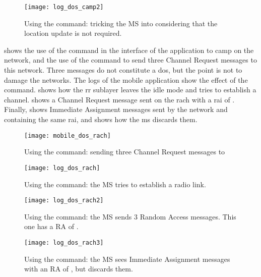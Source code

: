       \begin{figure}
        \centering
        \texttt{[image: log\_dos\_camp2]}
        \caption{Using the  command: tricking the MS into
        considering that the location update is not required.}
        \label{fig:log_dos_camp2}
      \end{figure}

       shows the use of the 
      command in the interface of the  application to camp
      on the  network, and the use of the 
      command to send three Channel Request messages to this network.
      Three messages do not constitute a \gls{dos}, but the point is
      not to damage the networks. The logs of the mobile application
      show the effect of the command.  shows how
      the \gls{rr} sublayer leaves the idle mode and tries to establish
      a channel.  shows a Channel Request
      message sent on the \gls{rach} with a \gls{rai} of .
      Finally,  shows Immediate Assignment
      messages sent by the network and containing the same \gls{rai},
      and shows how the \gls{ms} discards them.

      \begin{figure}
        \centering
        \texttt{[image: mobile\_dos\_rach]}
        \caption{Using the  command: sending three Channel
        Request messages to }
        \label{fig:mobile_dos_rach}
      \end{figure}

      \begin{figure}
        \centering
        \texttt{[image: log\_dos\_rach]}
        \caption{Using the  command: the MS tries to
        establish a radio link.}
        \label{fig:log_dos_rach}
      \end{figure}

      \begin{figure}
        \centering
        \texttt{[image: log\_dos\_rach2]}
        \caption{Using the  command: the MS sends 3
          Random Access messages. This one has a RA of .}
        \label{fig:log_dos_rach2}
      \end{figure}

      \begin{figure}
        \centering
        \texttt{[image: log\_dos\_rach3]}
        \caption{Using the  command: the MS sees
        Immediate Assignment messages with an RA of , but
      discards them.}
        \label{fig:log_dos_rach3}
      \end{figure}

